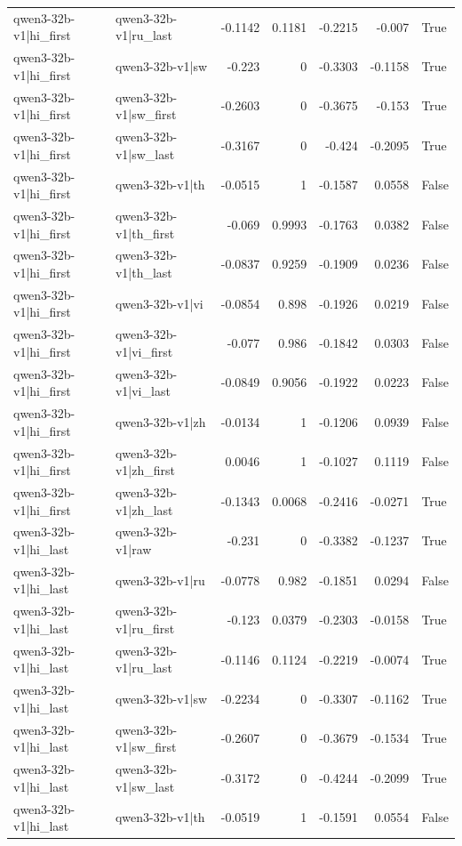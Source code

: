 \begin{table}
\begin{tabular}{l l r r r r l}
qwen3-32b-v1|hi_first & qwen3-32b-v1|ru_last & -0.1142 & 0.1181 & -0.2215 & -0.007 & True \\
qwen3-32b-v1|hi_first & qwen3-32b-v1|sw & -0.223 & 0 & -0.3303 & -0.1158 & True \\
qwen3-32b-v1|hi_first & qwen3-32b-v1|sw_first & -0.2603 & 0 & -0.3675 & -0.153 & True \\
qwen3-32b-v1|hi_first & qwen3-32b-v1|sw_last & -0.3167 & 0 & -0.424 & -0.2095 & True \\
qwen3-32b-v1|hi_first & qwen3-32b-v1|th & -0.0515 & 1 & -0.1587 & 0.0558 & False \\
qwen3-32b-v1|hi_first & qwen3-32b-v1|th_first & -0.069 & 0.9993 & -0.1763 & 0.0382 & False \\
qwen3-32b-v1|hi_first & qwen3-32b-v1|th_last & -0.0837 & 0.9259 & -0.1909 & 0.0236 & False \\
qwen3-32b-v1|hi_first & qwen3-32b-v1|vi & -0.0854 & 0.898 & -0.1926 & 0.0219 & False \\
qwen3-32b-v1|hi_first & qwen3-32b-v1|vi_first & -0.077 & 0.986 & -0.1842 & 0.0303 & False \\
qwen3-32b-v1|hi_first & qwen3-32b-v1|vi_last & -0.0849 & 0.9056 & -0.1922 & 0.0223 & False \\
qwen3-32b-v1|hi_first & qwen3-32b-v1|zh & -0.0134 & 1 & -0.1206 & 0.0939 & False \\
qwen3-32b-v1|hi_first & qwen3-32b-v1|zh_first & 0.0046 & 1 & -0.1027 & 0.1119 & False \\
qwen3-32b-v1|hi_first & qwen3-32b-v1|zh_last & -0.1343 & 0.0068 & -0.2416 & -0.0271 & True \\
qwen3-32b-v1|hi_last & qwen3-32b-v1|raw & -0.231 & 0 & -0.3382 & -0.1237 & True \\
qwen3-32b-v1|hi_last & qwen3-32b-v1|ru & -0.0778 & 0.982 & -0.1851 & 0.0294 & False \\
qwen3-32b-v1|hi_last & qwen3-32b-v1|ru_first & -0.123 & 0.0379 & -0.2303 & -0.0158 & True \\
qwen3-32b-v1|hi_last & qwen3-32b-v1|ru_last & -0.1146 & 0.1124 & -0.2219 & -0.0074 & True \\
qwen3-32b-v1|hi_last & qwen3-32b-v1|sw & -0.2234 & 0 & -0.3307 & -0.1162 & True \\
qwen3-32b-v1|hi_last & qwen3-32b-v1|sw_first & -0.2607 & 0 & -0.3679 & -0.1534 & True \\
qwen3-32b-v1|hi_last & qwen3-32b-v1|sw_last & -0.3172 & 0 & -0.4244 & -0.2099 & True \\
qwen3-32b-v1|hi_last & qwen3-32b-v1|th & -0.0519 & 1 & -0.1591 & 0.0554 & False \\

\end{tabular}
\end{table}
